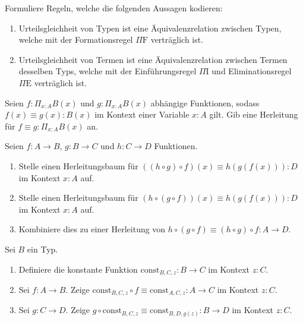 \documentclass{uebung}
\begin{document}

\begin{exercise}
  Formuliere Regeln, welche die folgenden Aussagen kodieren:
  \begin{enumerate}
    \item Urteilsgleichheit von Typen ist eine Äquivalenzrelation zwischen Typen, welche mit der Formationsregel $\Pi\mathrm{F}$ verträglich ist.
    \item Urteilsgleichheit von Termen ist eine Äquivalenzrelation zwischen Termen desselben Typs, welche mit der Einführungsregel $\Pi\mathrm{I}$ und Eliminationsregel $\Pi\mathrm{E}$ verträglich ist.
  \end{enumerate}
\end{exercise}

\begin{exercise}
  Seien $f:\Pi_{x:A}B(x)$ und $g:\Pi_{x:A}B(x)$ abhängige Funktionen, sodass $f(x)\equiv g(x):B(x)$ im Kontext einer Variable $x:A$ gilt.
  Gib eine Herleitung für $f\equiv g:\Pi_{x:A}B(x)$ an.
\end{exercise}

\begin{exercise}
  Seien $f:A\to B$, $g:B\to C$ und $h:C\to D$ Funktionen.
  \begin{enumerate}
    \item Stelle einen Herleitungsbaum für $((h\circ g)\circ f)(x)\equiv h(g(f(x))):D$ im Kontext $x:A$ auf.
    \item Stelle einen Herleitungsbaum für $(h\circ (g\circ f))(x)\equiv h(g(f(x))):D$ im Kontext $x:A$ auf.
    \item Kombiniere dies zu einer Herleitung von $h\circ(g\circ f)\equiv (h\circ g)\circ f:A\to D$.
  \end{enumerate}
\end{exercise}

\begin{exercise}
  Sei $B$ ein Typ.
  \begin{enumerate}
    \item Definiere die konstante Funktion $\mathrm{const}_{B,C,z}:B\to C$ im Kontext $z:C$.
    \item Sei $f:A\to B$.
      Zeige $\mathrm{const}_{B,C,z}\circ f \equiv \mathrm{const}_{A,C,z}:A\to C$ im Kontext $z:C$.
    \item Sei $g:C\to D$.
      Zeige $g\circ\mathrm{const}_{B,C,z} \equiv \mathrm{const}_{B,D,g(z)}:B\to D$ im Kontext $z:C$.
  \end{enumerate}
\end{exercise}
\end{document}
